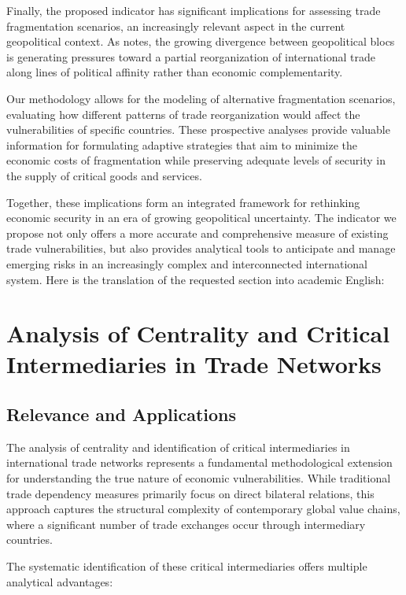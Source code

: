 \documentclass[final,1p,times,authoryear]{elsarticle}
\begin{document}
Finally, the proposed indicator has significant implications for assessing trade fragmentation scenarios, an increasingly relevant aspect in the current geopolitical context. As \citet{Campos2023} notes, the growing divergence between geopolitical blocs is generating pressures toward a partial reorganization of international trade along lines of political affinity rather than economic complementarity.

Our methodology allows for the modeling of alternative fragmentation scenarios, evaluating how different patterns of trade reorganization would affect the vulnerabilities of specific countries. These prospective analyses provide valuable information for formulating adaptive strategies that aim to minimize the economic costs of fragmentation while preserving adequate levels of security in the supply of critical goods and services.

Together, these implications form an integrated framework for rethinking economic security in an era of growing geopolitical uncertainty. The indicator we propose not only offers a more accurate and comprehensive measure of existing trade vulnerabilities, but also provides analytical tools to anticipate and manage emerging risks in an increasingly complex and interconnected international system.
Here is the translation of the requested section into academic English:

\section{Analysis of Centrality and Critical Intermediaries in Trade Networks}

\subsection{Relevance and Applications}

The analysis of centrality and identification of critical intermediaries in international trade networks represents a fundamental methodological extension for understanding the true nature of economic vulnerabilities. While traditional trade dependency measures primarily focus on direct bilateral relations, this approach captures the structural complexity of contemporary global value chains, where a significant number of trade exchanges occur through intermediary countries.

The systematic identification of these critical intermediaries offers multiple analytical advantages:
\end{document}
